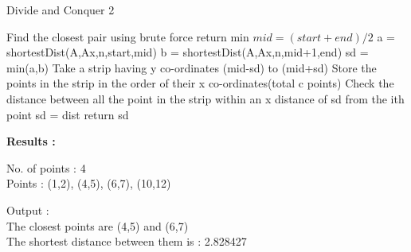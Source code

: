 \documentclass[a4paper,11pt]{article}
\begin{document}
\begin{enumerate}
 \begin{algorithm}
    \caption{Divide and Conquer 2}
    \begin{algorithmic}[1]
        \State Find the closest pair using brute force 
        \State return min
    \EndIf
    \State $mid = (start+end)/2$
    \State a = shortestDist(A,Ax,n,start,mid)
    \State b = shortestDist(A,Ax,n,mid+1,end)
    \State sd = min(a,b)
    \State Take a strip having y co-ordinates (mid-sd) to (mid+sd)
    \State Store the points in the strip in the order of their x co-ordinates(total c points)
        \State Check the distance between all the point in the strip within an x distance of sd from the ith point
            \State sd = dist
        \EndIf
    \EndFor
    \State return sd
    \end{algorithmic}
  \end{algorithm}
  
  \textbf{Results :}
  
  No. of points : 4\\
  Points : (1,2), (4,5), (6,7), (10,12)
  
  Output :\\
  The closest points are (4,5) and (6,7)\\
  The shortest distance between them is : 2.828427
  
\end{enumerate}
\end{document}
